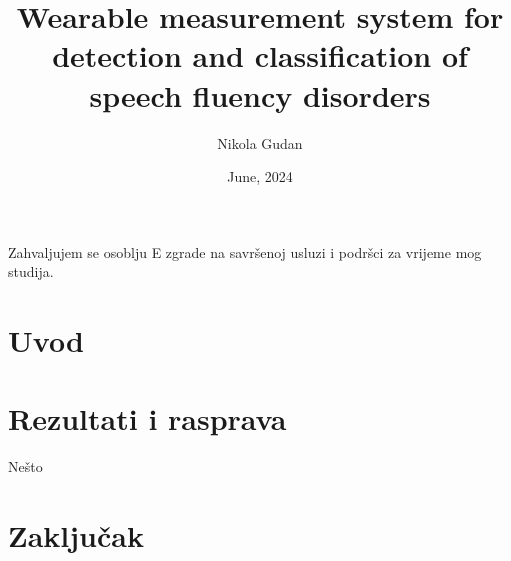\documentclass[diplomskirad]{fer}
\title{Wearable measurement system for detection and classification of speech fluency disorders}
\author{Nikola Gudan}
\date{June, 2024}
\begin{document}
\maketitle






\begin{zahvale}
  Zahvaljujem se osoblju E zgrade na savršenoj usluzi i podršci za vrijeme mog studija.
\end{zahvale}


\mainmatter


\tableofcontents


%
\chapter{Uvod}
\label{pog:uvod}




\chapter{Rezultati i rasprava}
\label{pog:rezultati_i_rasprava}

Nešto


\chapter{Zaključak}
\label{pog:zakljucak}


\end{document}
